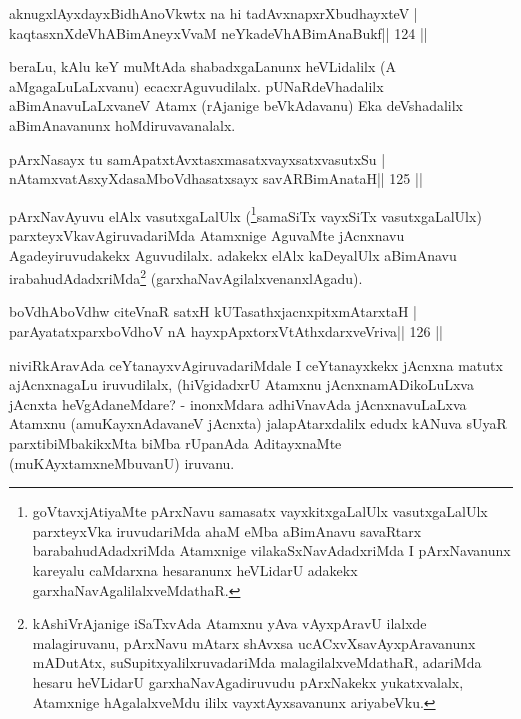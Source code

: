 
\begin{shl}
aknugxlAyxdayxBidhAnoVkwtx na hi tadAvxnapxrXbudhayxteV |
kaqtasxnXdeVhABimAneyxVvaM neYkadeVhABimAnaBukf\hfill || 124 ||
\end{shl}

\begin{artha}
beraLu, kAlu keY muMtAda shabadxgaLanunx heVLidalilx (A  aMgagaLuLaLxvanu) ecacxrAguvudilalx. pUNaRdeVhadalilx  aBimAnavuLaLxvaneV Atamx (rAjanige beVkAdavanu) Eka deVshadalilx aBimAnavanunx hoMdiruvavanalalx.
\end{artha}

\begin{shl}
pArxNasayx tu samApatxtAvxtasxmasatxvayxsatxvasutxSu |
nA\s\s tamxvatAsxyXdasaMboVdhasatxsayx savARBimAnataH\hfill || 125 ||
\end{shl}

\begin{artha}
pArxNavAyuvu elAlx vasutxgaLalUlx (\footnote{goVtavxjAtiyaMte  pArxNavu samasatx vayxkitxgaLalUlx vasutxgaLalUlx parxteyxVka iruvudariMda ahaM eMba aBimAnavu savaRtarx barabahudAdadxriMda Atamxnige vilakaSxNavAdadxriMda I pArxNavanunx kareyalu caMdarxna hesaranunx heVLidarU adakekx garxhaNavAgalilalxveMdathaR.}samaSiTx vayxSiTx vasutxgaLalUlx) parxteyxVkavAgiruvadariMda Atamxnige AguvaMte jAcnxnavu Agadeyiruvudakekx Aguvudilalx. adakekx elAlx kaDeyalUlx aBimAnavu irabahudAdadxriMda\footnote{kAshiVrAjanige iSaTxvAda Atamxnu yAva vAyxpAravU ilalxde malagiruvanu, pArxNavu mAtarx shAvxsa ucACxvXsavAyxpAravanunx mADutAtx, suSupitxyalilxruvadariMda malagilalxveMdathaR, adariMda hesaru heVLidarU garxhaNavAgadiruvudu pArxNakekx yukatxvalalx, Atamxnige hAgalalxveMdu ililx vayxtAyxsavanunx ariyabeVku.} (garxhaNavAgilalxvenanxlAgadu).
\end{artha}

\begin{shl}
boVdhAboVdhw citeVnaR satxH kUTasathxjacnxpitxmAtarxtaH |
parAyatatxparxboVdhoV nA hayxpApxtorxVtAthxdarxveVriva\hfill || 126 ||
\end{shl}

\begin{artha}
niviRkAravAda ceYtanayxvAgiruvadariMdale I ceYtanayxkekx jAcnxna matutx ajAcnxnagaLu iruvudilalx, (hiVgidadxrU Atamxnu jAcnxnamADikoLuLxva jAcnxta heVgAdaneMdare? - inonxMdara adhiVnavAda jAcnxnavuLaLxva Atamxnu (amuKayxnAdavaneV jAcnxta) jalapAtarxdalilx edudx kANuva sUyaR parxtibiMbakikxMta biMba rUpanAda AditayxnaMte (muKAyxtamxneMbuvanU) iruvanu.
\end{artha}

